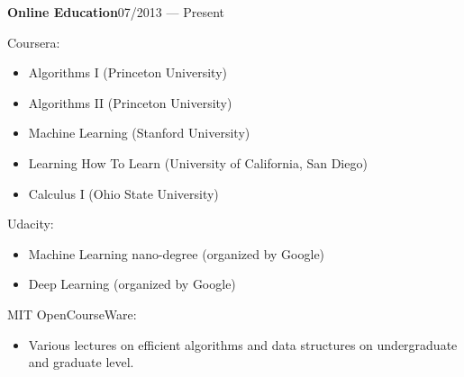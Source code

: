 \vspace{-2mm}
\begin{entry}{\textbf{Online Education}}{}{07/2013 --- Present}
  \item Coursera:
  \begin{itemize}
    \item Algorithms I (Princeton University)
    \item Algorithms II (Princeton University)
    \item Machine Learning (Stanford University)
    \item Learning How To Learn (University of California, San Diego)
    \item Calculus I (Ohio State University)
  \end{itemize}
  \item Udacity:
  \begin{itemize}
    \item Machine Learning nano-degree (organized by Google)
    \item Deep Learning (organized by Google)
  \end{itemize}
  \item MIT OpenCourseWare:
  \begin{itemize}
    \item Various lectures on efficient algorithms and data structures on undergraduate and graduate level.
  \end{itemize}
\end{entry}

\vspace{-2mm}
